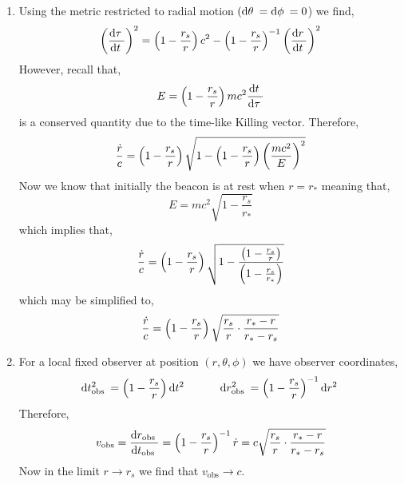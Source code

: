\documentclass[12pt]{article}
\begin{document}
\begin{enumerate}
\item Using the metric restricted to radial motion $(\mathrm{d}\theta \: = \mathrm{d}\phi \: = 0$) we find,
\[ \left( \frac{\mathrm{d}\tau \:}{\mathrm{d}t \:} \right)^2 = \left( 1 - \frac{r_s}{r} \right) c^2 - \left( 1 - \frac{r_s}{r} \right)^{-1} \left( \frac{\mathrm{d}r \:}{\mathrm{d}t \:} \right)^2 \]
However, recall that,
\[ E = \left( 1 - \frac{r_s}{r} \right) mc^2 \frac{\mathrm{d}t \:}{\mathrm{d}\tau \:} \]
is a conserved quantity due to the time-like Killing vector. Therefore,
\[ \frac{\dot{r}}{c} = \left( 1 - \frac{r_s}{r} \right) \sqrt{1 - \left( 1 - \frac{r_s}{r} \right) \left( \frac{mc^2}{E} \right)^2 } \]
Now we know that initially the beacon is at rest when $r = r_*$ meaning that,
\[ E =  mc^2 \sqrt{1 - \frac{r_s}{r_*}} \]
which implies that,
\[ \frac{\dot{r}}{c} = \left( 1 - \frac{r_s}{r} \right) \sqrt{1 - \frac{\left( 1 - \frac{r_s}{r} \right)}{\left( 1 - \frac{r_s}{r_*} \right)}} \]
which may be simplified to,
\[ \frac{\dot{r}}{c} = \left( 1 - \frac{r_s}{r} \right) \sqrt{\frac{r_s}{r}\cdot \frac{r_* - r}{r_* - r_s}} \]

\item For a local fixed observer at position $(r, \theta, \phi)$ we have observer coordinates,
\[ \mathrm{d}t_{\text{obs}}^2 \: = \left( 1 - \frac{r_s}{r} \right) \mathrm{d}t^2 \: \quad \quad \quad \mathrm{d}r_{\text{obs}}^2 \: = \left( 1 - \frac{r_s}{r} \right)^{-1} \mathrm{d}r^2 \: \]
Therefore, 
\[ v_{\text{obs}} = \frac{\mathrm{d}r_{\text{obs}} \:}{\mathrm{d}t_{\text{obs}} \:} = \left( 1 - \frac{r_s}{r} \right)^{-1} \dot{r} = c \sqrt{\frac{r_s}{r}\cdot \frac{r_* - r}{r_* - r_s}} \]
Now in the limit $r \to r_s$ we find that $v_{\text{obs}} \to c$.


\end{enumerate}
\end{document}
